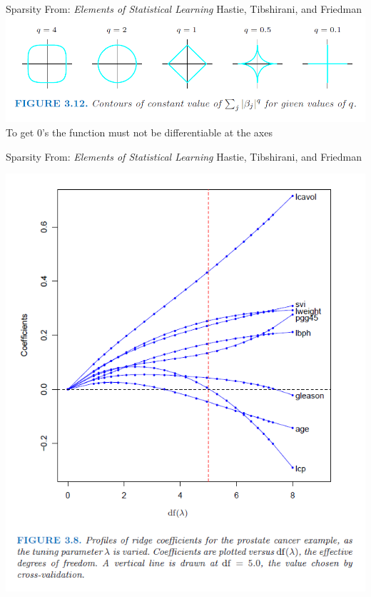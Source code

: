 \documentclass{beamer}\usepackage[]{graphicx}\usepackage[]{color}
\begin{document}
\begin{frame}{Sparsity}
From: \emph{Elements of Statistical Learning} Hastie, Tibshirani, and Friedman
\bigskip
\includegraphics[scale=.4]{RegularizationContours}\\
To get 0's the function must not be differentiable at the axes
\end{frame}

\begin{frame}{Sparsity}
From: \emph{Elements of Statistical Learning} Hastie, Tibshirani, and Friedman\\
\bigskip
\begin{center}
\includegraphics[scale=.26]{RidgeProfile}

\end{center}
\end{frame}
\end{document}
